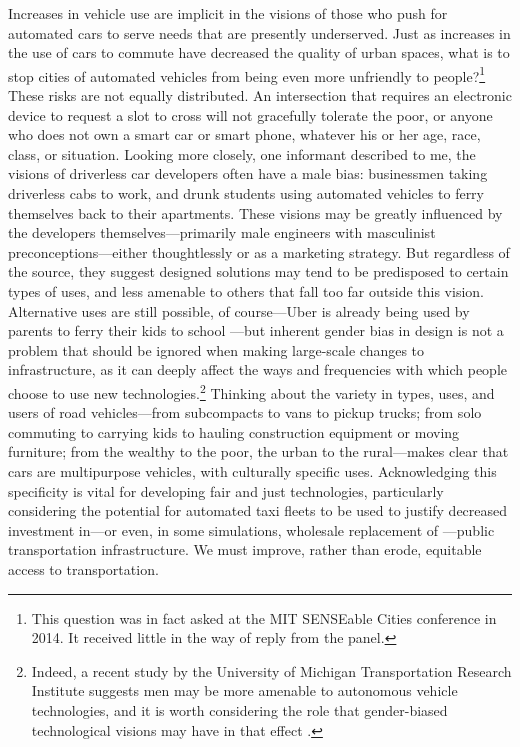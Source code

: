 Increases in vehicle use are
implicit in the visions of those who push for automated cars to serve needs that are presently
underserved. Just as increases in the use of cars to commute have
decreased the quality of urban spaces, what is to stop cities of
automated vehicles from
being even more unfriendly to
people?\footnote{This question was in fact asked at the MIT SENSEable Cities
conference in 2014. It received little in the way of reply from the
panel.} These risks are not equally distributed. An intersection that requires
an electronic device to request a slot 
to cross will not gracefully tolerate the poor, or anyone who
does not own a smart car or smart phone, whatever his or her age,
race, class, or situation. Looking more closely, one informant
described to me, the visions
of driverless car developers
often have a male bias: businessmen
taking driverless cabs to work, and drunk students using
automated vehicles to ferry themselves 
back to their apartments. These visions may be greatly influenced by
the developers themselves---primarily male engineers with masculinist
preconceptions---either thoughtlessly or as a marketing strategy. But
regardless of the source, they suggest designed solutions may tend to
be predisposed to certain types of uses, and less amenable to others
that fall too far outside this vision. Alternative uses are still
possible, of course---Uber is already being used by parents to ferry
their kids to school \cite{hoderParents} \cite{shapiroVan}---but
inherent gender bias in design is not a problem that should be ignored 
when making large-scale changes to infrastructure, as it can deeply
affect the ways and frequencies with which people choose to use new
technologies.\footnote{Indeed, a recent study by the University of Michigan
Transportation Research Institute suggests men may be more
amenable to autonomous vehicle technologies, and it is worth
considering the role that gender-biased technological visions may have
in that
effect \cite{miglioreWomen}.}
Thinking about the variety in types, uses, and users of road vehicles---from
subcompacts to vans to pickup trucks; from solo commuting to carrying kids to
hauling construction equipment or moving furniture; from the wealthy
to the poor, the urban to the rural---makes clear that cars are
multipurpose vehicles, with culturally specific uses.
Acknowledging this
specificity is vital for developing fair and just technologies,
particularly
considering the potential for automated taxi fleets to 
be used to justify decreased investment in---or even, in some
simulations, wholesale replacement of
\cite{frazzoliSingapore}---public transportation infrastructure. We must
improve, rather than erode, equitable access to transportation.

